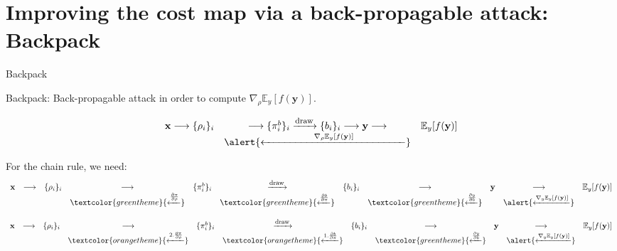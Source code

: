 \documentclass[10pt,aspectratio=169]{beamer}
\begin{document}
\section{Improving the cost map via a back-propagable attack: Backpack}


\begin{frame}{Backpack}

    \alert{Backpack}: \alert{Back-p}ropagable att\alert{ack} \pause in order to compute \alert{$\nabla_\rho \mathbb{E}_{y} [f(\mathbf{y})]$}.

    \begin{equation*}
        \begin{array}{ccccccccccc}
            \mathbf{x} \longrightarrow \{\rho_i\}_i & \longrightarrow  \{\pi_i^b\}_i    \xrightarrow{\mbox{\footnotesize{draw}}}  \{b_i\}_i   \longrightarrow  \mathbf{y}  \longrightarrow  & \mathbb{E}_{y} [f(\mathbf{y})] \\ 
            & \alert{\xleftarrow{\hspace{5em} \nabla_\rho \mathbb{E}_{y} [f(\mathbf{y})]\hspace{5em}}} 
        \end{array}
    \end{equation*}
    
    \pause
    For the chain rule, we need:
    \begin{equation*}
        \begin{array}{ccccccccccc}
            \mathbf{x} & \longrightarrow & \{\rho_i\}_i & \longrightarrow & \{\pi_i^b\}_i & \xrightarrow{\mbox{\footnotesize{draw}}} &  \{b_i\}_i  & \longrightarrow  & \mathbf{y} & \longrightarrow  & \mathbb{E}_{y} [f(\mathbf{y})] \\ 
            &&& \textcolor{greentheme}{\xleftarrow{\frac{\partial \pi}{\partial \rho} }}
            && \textcolor{greentheme}{\xleftarrow{\frac{\partial b}{\partial \pi} }}
            && \textcolor{greentheme}{\xleftarrow{\frac{\partial y}{\partial b}}}
            && \alert{\xleftarrow{\nabla_y \mathbb{E}_{y} [f(\mathbf{y})]}} 
            

        \end{array}
    \end{equation*}

    \pause
    \begin{equation*}
        \begin{array}{ccccccccccc}
            \mathbf{x} & \longrightarrow & \{\rho_i\}_i & \longrightarrow & \{\pi_i^b\}_i & \xrightarrow{\mbox{\footnotesize{draw}}} &  \{b_i\}_i  & \longrightarrow  & \mathbf{y} & \longrightarrow  & \mathbb{E}_{y} [f(\mathbf{y})] \\ 
            &&& \textcolor{orangetheme}{\xleftarrow{2. \frac{\partial \pi}{\partial \rho} }}
            && \textcolor{orangetheme}{\xleftarrow{1. \frac{\partial b}{\partial \pi} }}
            && \textcolor{greentheme}{\xleftarrow{\frac{\partial y}{\partial b}}}
            && \alert{\xleftarrow{\nabla_y \mathbb{E}_{y} [f(\mathbf{y})]}} 
        \end{array}
    \end{equation*}
    

\end{frame}
\end{document}

